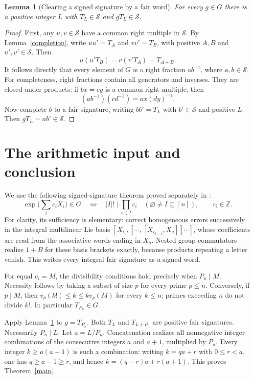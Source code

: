 \documentclass[11pt]{article}
\newtheorem{lemma}[theorem]{Lemma}
\begin{document}
\begin{lemma}[Clearing a signed signature by a fair word]\label{clearing}
For every $g\in G$ there is a positive integer $L$ with
$T_L\in\mathcal S$ and $gT_L\in\mathcal S$.
\end{lemma}
\begin{proof}
First, any $u,v\in\mathcal S$ have a common right multiple in
$\mathcal S$. By Lemma~\ref{completion}, write
$u u'=T_A$ and $v v'=T_B$, with positive $A,B$ and $u',v'\in\mathcal S$.
Then
\[
 u(u'T_B)=v(v'T_A)=T_{A+B}.
\]
It follows directly that every element of $G$ is a right fraction
$a b^{-1}$, where $a,b\in\mathcal S$. For completeness, right fractions
contain all generators and inverses. They are closed under products:
if $b x=c y$ is a common right multiple, then
\[
 (a b^{-1})(c d^{-1})=a x(d y)^{-1}.
\]
Now complete $b$ to a fair signature, writing $b b'=T_L$ with
$b'\in\mathcal S$ and positive $L$. Then
$gT_L=a b'\in\mathcal S$.
\end{proof}

\section*{The arithmetic input and conclusion}
We use the following signed-signature theorem proved separately in
:
\[
 \exp\Big(\sum_i c_iX_i\Big)\in G
 \quad\Longleftrightarrow\quad
 |I|!\mid\prod_{i\in I}c_i\quad(\varnothing\ne I\subseteq[n]),
 \qquad c_i\in\mathbb Z.
\]
For clarity, its sufficiency is elementary: correct homogeneous errors
successively in the integral multilinear Lie basis
$[X_{i_1},[\cdots,[X_{i_{k-1}},X_a]]\cdots]$, whose coefficients are
read from the associative words ending in $X_a$. Nested group
commutators realize $1+B$ for these basis brackets exactly, because
products repeating a letter vanish. This writes every integral fair
signature as a signed word.

For equal $c_i=M$, the divisibility conditions hold precisely when
$P_n\mid M$. Necessity follows by taking a subset of size $p$ for every
prime $p\le n$. Conversely, if $p\mid M$, then
$v_p(k!)\le k\le k v_p(M)$ for every $k\le n$; primes exceeding $n$
do not divide $k!$. In particular $T_{P_n}\in G$.

Apply Lemma~\ref{clearing} to $g=T_{P_n}$. Both $T_L$ and
$T_{L+P_n}$ are positive fair signatures. Necessarily $P_n\mid L$.
Let $a=L/P_n$. Concatenation realizes all nonnegative integer
combinations of the consecutive integers $a$ and $a+1$, multiplied
by $P_n$. Every integer $k\ge a(a-1)$ is such a combination: writing
$k=qa+r$ with $0\le r<a$, one has $q\ge a-1\ge r$, and hence
$k=(q-r)a+r(a+1)$. This proves Theorem~\ref{main}.
\end{document}
